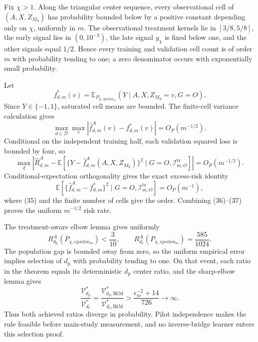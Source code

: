 Fix \(\chi>1\). Along the triangular center sequence, every observational cell of \((A,X,Z_{M_d})\) has probability bounded below by a positive constant depending only on \(\chi\), uniformly in \(m\). The observational treatment kernels lie in \([3/8,5/8]\), the early signal lies in \((0,10^{-3})\), the late signal \(y_\chi\) is fixed below one, and the other signals equal \(1/2\). Hence every training and validation cell count is of order \(m\) with probability tending to one; a zero denominator occurs with exponentially small probability.

Let
\[
 f_{d,m}^*(v)=\mathbb E_{P_{\chi,epsilon_m}}(Y\mid A,X,Z_{M_d}=v,G=O).
\]
Since \(Y\in\{-1,1\}\), saturated cell means are bounded. The finite-cell variance calculation gives
\[
 \max_{d\in\mathcal D}\max_v
 |\widehat f_{d,m}^A(v)-f_{d,m}^*(v)|=O_P(m^{-1/2}).         \tag{35}
\]
Conditional on the independent training half, each validation squared loss is bounded by four, so
\[
 \max_d\left|\widehat R_{d,m}^A-
 \mathbb E\!\left[\{Y-\widehat f_{d,m}^A(A,X,Z_{M_d})\}^2
 \mid G=O,\mathcal I_{m,O}^{\mathrm{tr}}\right]\right|
 =O_P(m^{-1/2}).                                            \tag{36}
\]
Conditional-expectation orthogonality gives the exact excess-risk identity
\[
 \mathbb E\!\left[
 \{\widehat f_{d,m}^A-f_{d,m}^*\}^2
 \mid G=O,\mathcal I_{m,O}^{\mathrm{tr}}
 \right]=O_P(m^{-1}),                                      \tag{37}
\]
where (35) and the finite number of cells give the order. Combining (36)--(37) proves the uniform \(m^{-1/2}\) risk rate.

The treatment-aware elbow lemma gives uniformly
\[
 R_{d_{\mathrm p}}^A(P_{\chi,epsilon_m})<\frac3{10},
 \qquad
 R_{d_{\mathrm e}}^A(P_{\chi,epsilon_m})=\frac{585}{1024}.
\]
The population gap is bounded away from zero, so the uniform empirical error implies selection of \(d_{\mathrm p}\) with probability tending to one. On that event, each ratio in the theorem equals its deterministic \(d_{\mathrm p}\) center ratio, and the sharp-elbow lemma gives
\[
 \frac{\mathcal V_{d_{\mathrm p}}^*}{\mathcal V_{d_{\mathrm e}}^*}
 =\frac{\mathcal V_{d_{\mathrm p},\mathrm{IKM}}^*}
 {\mathcal V_{d_{\mathrm e},\mathrm{IKM}}^*}
 >\frac{\epsilon_m^{-2}+14}{726}\longrightarrow\infty.  \tag{38}
\]
Thus both achieved ratios diverge in probability. Pilot independence makes the rule feasible before main-study measurement, and no inverse-bridge learner enters this selection proof.